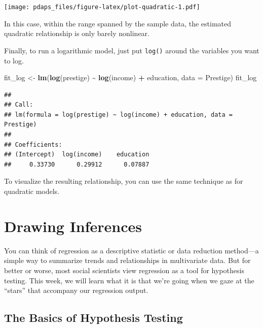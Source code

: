 \documentclass[
  12pt,
  oneside,openany]{book}
\newenvironment{Shaded}{\begin{snugshade}}{\end{snugshade}}
\newcommand{\DataTypeTok}[1]{\textcolor[rgb]{0.13,0.29,0.53}{#1}}
\newcommand{\KeywordTok}[1]{\textcolor[rgb]{0.13,0.29,0.53}{\textbf{#1}}}
\newcommand{\NormalTok}[1]{#1}
\newcommand{\OperatorTok}[1]{\textcolor[rgb]{0.81,0.36,0.00}{\textbf{#1}}}
\newcommand{\StringTok}[1]{\textcolor[rgb]{0.31,0.60,0.02}{#1}}
\begin{document}
\texttt{[image: pdaps\_files/figure-latex/plot-quadratic-1.pdf]}

In this case, within the range spanned by the sample data, the estimated quadratic relationship is only barely nonlinear.

Finally, to run a logarithmic model, just put \texttt{log()} around the variables you want to log.

\begin{Shaded}
\begin{Highlighting}[]
\NormalTok{fit\_log <{-}}\StringTok{ }\KeywordTok{lm}\NormalTok{(}\KeywordTok{log}\NormalTok{(prestige) }\OperatorTok{\textasciitilde{}}\StringTok{ }\KeywordTok{log}\NormalTok{(income) }\OperatorTok{+}\StringTok{ }\NormalTok{education, }\DataTypeTok{data =}\NormalTok{ Prestige)}
\NormalTok{fit\_log}
\end{Highlighting}
\end{Shaded}

\begin{verbatim}
## 
## Call:
## lm(formula = log(prestige) ~ log(income) + education, data = Prestige)
## 
## Coefficients:
## (Intercept)  log(income)    education  
##     0.33730      0.29912      0.07887
\end{verbatim}

To visualize the resulting relationship, you can use the same technique as for quadratic models.

\hypertarget{inference}{%
\chapter{Drawing Inferences}\label{inference}}

\providecommand{\Cov}{}
\renewcommand{\Cov}{\mathop{\rm Cov}\nolimits}
\providecommand{\SE}{}
\renewcommand{\SE}{\mathop{\rm SE}\nolimits}
\providecommand{\CI}{}
\renewcommand{\CI}{\mathop{\rm CI}\nolimits}

You can think of regression as a descriptive statistic or data reduction method---a simple way to summarize trends and relationships in multivariate data. But for better or worse, most social scientists view regression as a tool for hypothesis testing. This week, we will learn what it is that we're going when we gaze at the ``stars'' that accompany our regression output.

\hypertarget{the-basics-of-hypothesis-testing}{%
\section{The Basics of Hypothesis Testing}\label{the-basics-of-hypothesis-testing}}
\end{document}
